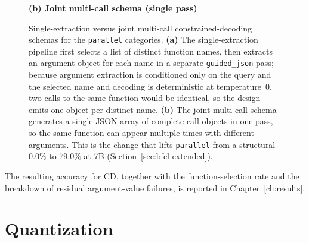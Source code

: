 \begin{figure}[ht]
\vspace{8pt}
\textbf{(b) Joint multi-call schema (single pass)}\\[2pt]
\caption{Single-extraction versus joint multi-call constrained-decoding
schemas for the \texttt{parallel} categories. \textbf{(a)} The
single-extraction pipeline first selects a list of distinct function names,
then extracts an argument object for each name in a separate
\texttt{guided\_json} pass; because argument extraction is conditioned only
on the query and the selected name and decoding is deterministic at
temperature~0, two calls to the same function would be identical, so the
design emits one object per distinct name. \textbf{(b)} The joint multi-call
schema generates a single JSON array of complete call objects in one pass,
so the same function can appear multiple times with different arguments.
This is the change that lifts \texttt{parallel} from a structural $0.0\%$ to
$79.0\%$ at 7B (Section~\ref{sec:bfcl-extended}).}
\label{fig:single-vs-joint}
\end{figure}

The resulting accuracy for CD, together with the function-selection rate
and the breakdown of residual argument-value failures, is reported in
Chapter~\ref{ch:results}.

\section{Quantization}

